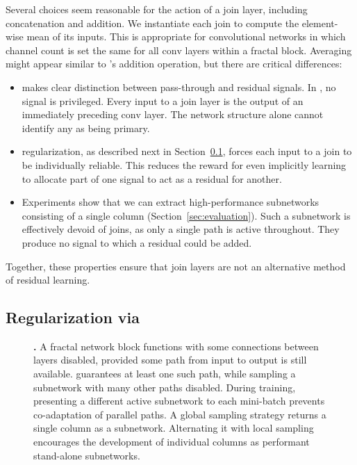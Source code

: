 Several choices seem reasonable for the action of a $\mathrm{join}$ layer,
including concatenation and addition.  We instantiate each $\mathrm{join}$
to compute the element-wise mean of its inputs.  This is appropriate for
convolutional networks in which channel count is set the same for all
$\mathrm{conv}$ layers within a fractal block.  Averaging might appear similar
to {\resnet}'s addition operation, but there are critical differences:
\begin{itemize}
   \item{
      {\Resnet} makes clear distinction between pass-through and residual
      signals.  In {\fracnet}, no signal is privileged.  Every input to a
      $\mathrm{join}$ layer is the output of an immediately preceding
      $\mathrm{conv}$ layer.  The network structure alone cannot identify any
      as being primary.
   }
   \item{
      {\Droppath} regularization, as described next in
      Section~\ref{sec:droppath}, forces each input to a $\mathrm{join}$ to
      be individually reliable.  This reduces the reward for even implicitly
      learning to allocate part of one signal to act as a residual for
      another.
   }
   \item{
      Experiments show that we can extract high-performance subnetworks
      consisting of a single column (Section~\ref{sec:evaluation}).  Such a
      subnetwork is effectively devoid of joins, as only a single path is
      active throughout.  They produce no signal to which a residual could be
      added.
   }
\end{itemize}
Together, these properties ensure that $\mathrm{join}$ layers are not an
alternative method of residual learning.

\subsection{Regularization via {\Droppath}}
\label{sec:droppath}

\begin{figure}[t]
   \begin{center}
      
   \end{center}
   \vspace{-0.02\linewidth}
   \caption{
      \textbf{{\Droppath}.}
         A fractal network block functions with some connections between layers
         disabled, provided some path from input to output is still available.
         {\Droppath} guarantees at least one such path, while sampling a
         subnetwork with many other paths disabled.  During training,
         presenting a different active subnetwork to each mini-batch prevents
         co-adaptation of parallel paths.  A global sampling strategy
         returns a single column as a subnetwork.  Alternating it with local
         sampling encourages the development of individual columns as
         performant stand-alone subnetworks.
   }
   \label{fig:droppath}
\end{figure}

